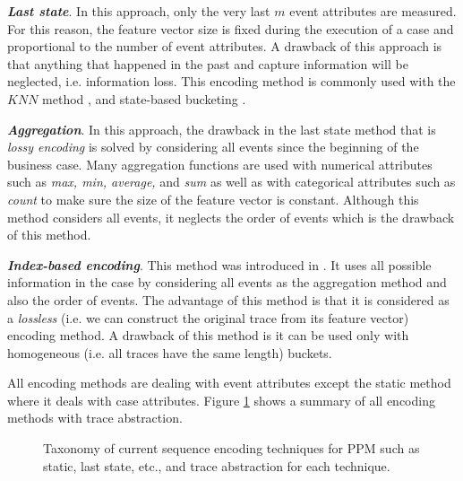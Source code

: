 \textbf{\textit{Last state}}.
 In this approach, only the very last $m$ event attributes are measured. For this reason, the feature vector size is fixed during the execution of a case and proportional to the number of event attributes. A drawback of this approach is that anything that happened in the past and capture information will be neglected, i.e. information loss. This encoding method is commonly used with the $KNN$ method \cite{maggi2014predictive},  and state-based bucketing \cite{conforti2015recommendation}.

\textbf{\textit{Aggregation}}. In this approach, the drawback in the last state method that is \textit{lossy encoding} is solved by considering all events since the beginning of the business case. Many aggregation functions are used with numerical attributes such as \textit{max, min, average,} and \textit{sum} as well as with categorical attributes such as \textit{count} \cite{de2016general} to make sure the size of the feature vector is constant. Although this method considers all events, it neglects the order of events which is the drawback of this method.

\textbf{\textit{Index-based encoding}}. This method was introduced in \cite{van2012process}. It uses all possible information in the case by considering all events as the aggregation method and also the order of events. The advantage of this method is that it is considered as a \textit{lossless} (i.e. we can construct the original trace from its feature vector) encoding method.  A drawback of this method is it can be used only with homogeneous (i.e. all traces have the same length) buckets. 

All encoding methods are dealing with event attributes except the static method where it deals with case attributes. Figure \ref{fig:enc1} shows a summary of  all encoding methods with trace abstraction. 

\begin{figure}[htb]
	\begin{center}
		\caption[Encoding methods and trace abstraction]{Taxonomy of current sequence encoding techniques for PPM such as static, last state, etc., and trace abstraction for each technique.}
		\label{fig:enc1}
	\end{center}
\end{figure}

